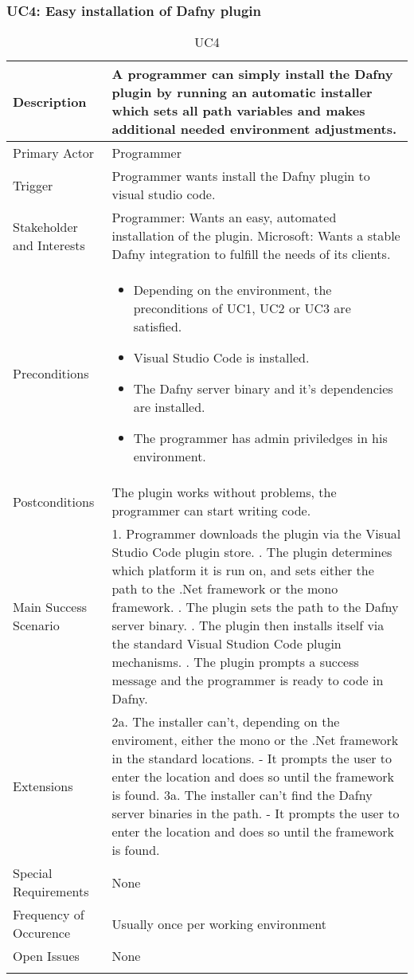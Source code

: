 \subsubsection{UC4: Easy installation of Dafny plugin}
\begin{longtable}{l | p{} }
	Description & A programmer can simply install the Dafny plugin by running an automatic installer which sets all path variables and makes additional needed environment adjustments.\\ \hline
	Primary Actor & Programmer\\ \hline
	Trigger & Programmer wants install the Dafny plugin to visual studio code.\\ \hline
	Stakeholder and Interests & Programmer: Wants an easy, automated installation of the plugin. \newline Microsoft: Wants a stable Dafny integration to fulfill the needs of its clients.\\ \hline
	Preconditions &\begin{itemize}
		\item Depending on the environment, the preconditions of UC1, UC2 or UC3 are satisfied.
		\item Visual Studio Code is installed.
		\item The Dafny server binary and it's dependencies are installed.
		\item The programmer has admin priviledges in his environment.
	\end{itemize}\\ \hline
	Postconditions & The plugin works without problems, the programmer can start writing code.\\ \hline
	Main Success Scenario & 
	1. Programmer downloads the plugin via the Visual Studio Code plugin store. \newline
	2. The plugin determines which platform it is run on, and sets either the path to the .Net framework or the mono framework. \newline
	3. The plugin sets the path to the Dafny server binary. \newline
	4. The plugin then installs itself via the standard Visual Studion Code plugin mechanisms. \newline
	5. The plugin prompts a success message and the programmer is ready to code in Dafny.\\ \hline
	Extensions & 
	2a. The installer can't, depending on the enviroment, either the mono or the .Net framework in the standard locations. \newline 
	- It prompts the user to enter the location and does so until the framework is found. \newline
	3a. The installer can't find the Dafny server binaries in the path. \newline
	- It prompts the user to enter the location and does so until the framework is found.\\ \hline
	Special Requirements & None\\ \hline
	Frequency of Occurence & Usually once per working environment\\ \hline
	Open Issues & None \\ \hline
	\caption{UC4}
\end{longtable}

